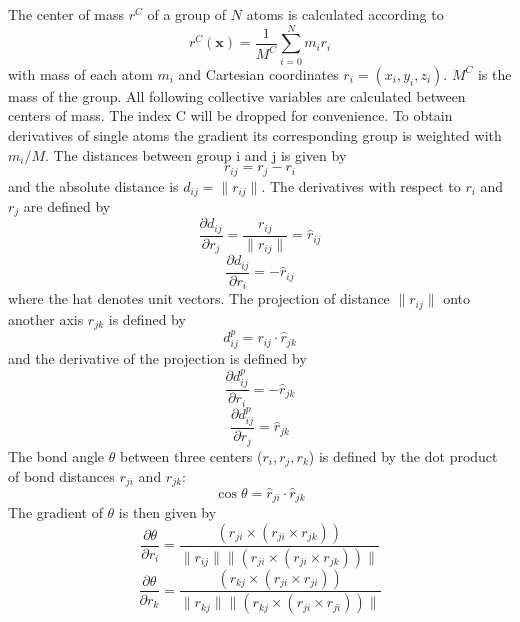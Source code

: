 The center of mass $r^C$ of a group of $N$ atoms is calculated according to
\begin{equation}
  r^C(\textbf{x}) = \frac{1}{M^C} \sum_{i=0}^N m_i r_i
\end{equation}
with mass of each atom $m_i$ and Cartesian coordinates $r_i = (x_i,y_i,z_i)$. $M^C$ is the mass of the group.
All following collective variables are calculated between centers of mass. The index C will be dropped for convenience.
To obtain derivatives of single atoms the gradient its corresponding group is weighted with $m_i/M$.
The distances between group i and j is given by
\begin{equation}
 r_{ij} = r_j - r_i
\end{equation}
and the absolute distance is $d_{ij} = \| r_{ij}\|$.
The derivatives with respect to $r_i$ and $r_j$ are defined by
\begin{equation}
  \frac{\partial d_{ij}}{\partial r_j} = \frac{r_{ij}}{\|r_{ij}\|} = \hat{r}_{ij}
\end{equation}
\begin{equation}
  \frac{\partial d_{ij}}{\partial r_i} = - \hat{r}_{ij}
\end{equation}
where the hat denotes unit vectors.
The projection of distance $\| r_{ij}\|$ onto another axis $r_{jk}$ is defined by
\begin{equation}
  d^p_{ij} = r_{ij} \cdot \hat{r}_{jk}
\end{equation}
and the derivative of the projection is defined by
\begin{equation}
   \frac{\partial d^p_{ij}}{\partial r_i} = -\hat{r}_{jk}
\end{equation}
\begin{equation}
   \frac{\partial d^p_{ij}}{\partial r_j} = \hat{r}_{jk}
\end{equation}
The bond angle $\theta$ between three centers ($r_i, r_j, r_k$) is defined by the dot product of bond distances $r_{ji}$ and $r_{jk}$:
\begin{equation}
  \cos \theta = \hat{r}_{ji} \cdot \hat{r}_{jk}
\end{equation}
The gradient of $\theta$ is then given by
\begin{equation}
  \frac{\partial \theta}{\partial r_i} = \frac{(r_{ji} \times (r_{ji} \times r_{jk})) }{\| r_{ij}\| \| (r_{ji} \times (r_{ji} \times r_{jk})) \|}
\end{equation}
\begin{equation}
  \frac{\partial \theta}{\partial r_k} = \frac{(r_{kj} \times (r_{ji} \times r_{ji}))}{\| r_{kj}\| \| (r_{kj} \times (r_{ji} \times r_{ji})) \|}
\end{equation}
